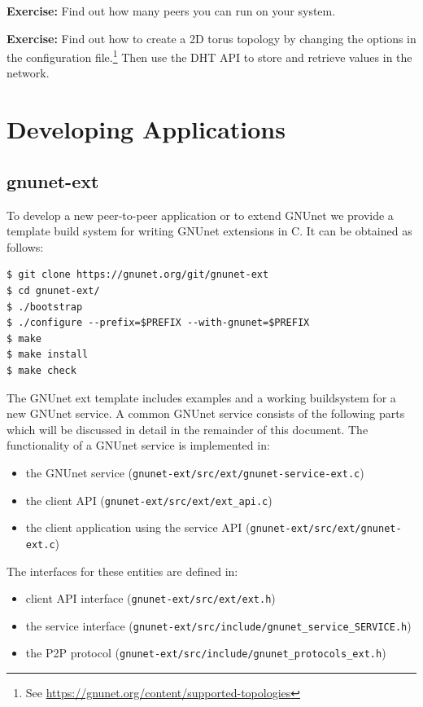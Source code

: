 \documentclass[10pt]{article}
\newcommand{\exercise}[1]{\noindent\begin{boxedminipage}{\textwidth}{\bf Exercise:} #1 \end{boxedminipage}}
\begin{document}
\exercise{Find out how many peers you can run on your system.}

\exercise{Find out how to create a 2D torus topology by changing the
  options in the configuration file.\footnote{See \url{https://gnunet.org/content/supported-topologies}}
  Then use the DHT API to store and retrieve values in the
  network.}


\section{Developing Applications}

\subsection{gnunet-ext}
To develop a new peer-to-peer application or to extend GNUnet we provide
a template build system for writing GNUnet extensions in C. It can be
obtained as follows:

\lstset{language=bash}
\begin{lstlisting}
$ git clone https://gnunet.org/git/gnunet-ext
$ cd gnunet-ext/
$ ./bootstrap
$ ./configure --prefix=$PREFIX --with-gnunet=$PREFIX
$ make
$ make install
$ make check
\end{lstlisting}

The GNUnet ext template includes examples and a working buildsystem for a new GNUnet service.
A common GNUnet service consists of the following parts which will be discussed in detail in the
remainder of this document. The functionality of a GNUnet service is implemented in:

\begin{itemize}
\itemsep0em
  \item the GNUnet service (\lstinline|gnunet-ext/src/ext/gnunet-service-ext.c|)
  \item the client API (\lstinline|gnunet-ext/src/ext/ext_api.c|)
  \item the client application using the service API (\lstinline|gnunet-ext/src/ext/gnunet-ext.c|)


\end{itemize}

The interfaces for these entities are defined in:
\begin{itemize}
\itemsep0em
  \item client API interface (\lstinline|gnunet-ext/src/ext/ext.h|)
  \item the service interface (\lstinline|gnunet-ext/src/include/gnunet_service_SERVICE.h|)
  \item the P2P protocol (\lstinline|gnunet-ext/src/include/gnunet_protocols_ext.h|)
\end{itemize}
\end{document}
